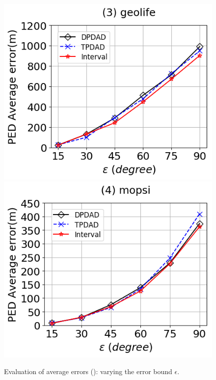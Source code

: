 \begin{figure}[tb!]
	\includegraphics[scale=0.315]{Figures/Exp-DAD-pedAveErr-epsilon-geolife.png}	\hspace{1ex}
	\includegraphics[scale=0.315]{Figures/Exp-DAD-pedAveErr-epsilon-mopsi.png}	
	\vspace{-3ex}
	\caption{\small Evaluation of average errors (\dad): varying the error bound $\epsilon$.}
	\label{fig:ae-dad-ped-epsilon}
	\vspace{-2ex}
\end{figure}

